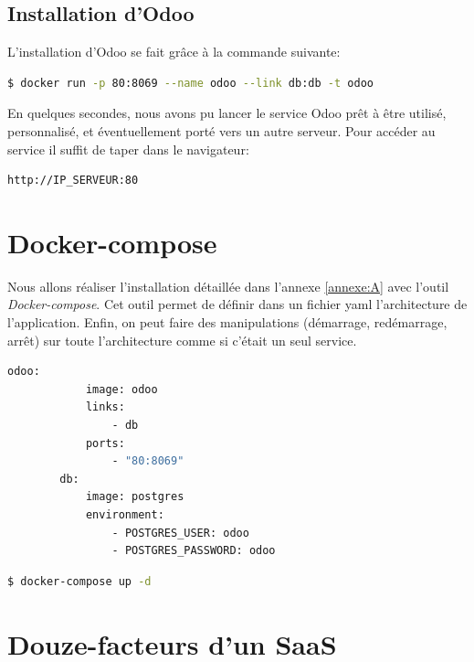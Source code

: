 \section*{Installation d'Odoo}

	L'installation d'Odoo se fait grâce à la commande suivante:
	\begin{lstlisting}[language=bash,caption=Installation d'Odoo]
		$ docker run -p 80:8069 --name odoo --link db:db -t odoo
	\end{lstlisting}

	En quelques secondes, nous avons pu lancer le service Odoo prêt à être utilisé, personnalisé, et éventuellement porté vers un autre serveur. Pour accéder au service il suffit de taper dans le navigateur:

	\begin{lstlisting}[language=bash]
		http://IP_SERVEUR:80
	\end{lstlisting}

	




\chapter{Docker-compose}

	Nous allons réaliser l'installation détaillée dans l'annexe \ref{annexe:A} avec l'outil \emph{Docker-compose}. Cet outil permet de définir dans un fichier \acrshort{yaml} l'architecture de l'application. Enfin, on peut faire des manipulations (démarrage, redémarrage, arrêt) sur toute l'architecture comme si c'était un seul service.

	\begin{lstlisting}[language=bash,caption=Installation d'Odoo avec Docker-compose]
		odoo:
	  		image: odoo
		  	links:
		   		- db
		  	ports:
		   		- "80:8069"
		db:
		  	image: postgres
		  	environment:
  				- POSTGRES_USER: odoo
  				- POSTGRES_PASSWORD: odoo
	\end{lstlisting}

	\begin{lstlisting}[language=bash,caption=Lancement d'Odoo avec Docker-compose]
		$ docker-compose up -d
	\end{lstlisting}



\chapter{Douze-facteurs d'un SaaS}
\label{annexe:12factors}

